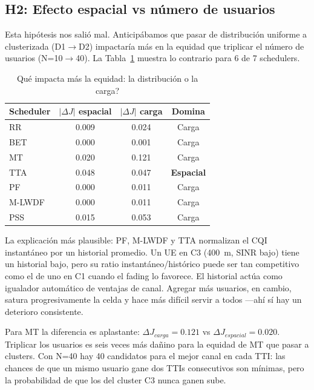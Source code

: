 \documentclass[conference]{IEEEtran}
\begin{document}
\subsection{H2: Efecto espacial vs número de usuarios}

Esta hipótesis nos salió mal. Anticipábamos que pasar de distribución uniforme a
clusterizada (D1$\to$D2) impactaría más en la equidad que triplicar el número de
usuarios (N=10$\to$40). La Tabla~\ref{tab:h2} muestra lo contrario para 6 de 7
schedulers.

\begin{table}[t]
  \centering
  \caption{\textquestiondown{}Qué impacta más la equidad: la distribución o la carga?}
  \label{tab:h2}
  \footnotesize
  \begin{tabular}{@{}lccc@{}}
    \toprule
    \textbf{Scheduler} & $|\Delta J|$ \textbf{espacial} & $|\Delta J|$ \textbf{carga} & \textbf{Domina} \\
    \midrule
    RR     & 0.009 & 0.024 & Carga \\
    BET    & 0.000 & 0.001 & Carga \\
    MT     & 0.020 & 0.121 & Carga \\
    TTA    & 0.048 & 0.047 & \textbf{Espacial} \\
    PF     & 0.000 & 0.011 & Carga \\
    M-LWDF & 0.000 & 0.011 & Carga \\
    PSS    & 0.015 & 0.053 & Carga \\
    \bottomrule
  \end{tabular}
\end{table}

La explicación más plausible: PF, M-LWDF y TTA normalizan el CQI instantáneo por un
historial promedio. Un UE en C3 (400~m, SINR bajo) tiene un historial bajo, pero su
ratio instantáneo/histórico puede ser tan competitivo como el de uno en C1 cuando el
fading lo favorece. El historial actúa como igualador automático de ventajas de canal.
Agregar más usuarios, en cambio, satura progresivamente la celda y hace más difícil
servir a todos ---ahí sí hay un deterioro consistente.

Para MT la diferencia es aplastante: $\Delta J_{carga}=0.121$ vs $\Delta J_{espacial}=0.020$.
Triplicar los usuarios es seis veces más dañino para la equidad de MT que pasar a
clusters. Con N=40 hay 40 candidatos para el mejor canal en cada TTI: las chances de
que un mismo usuario gane dos TTIs consecutivos son mínimas, pero la probabilidad de
que los del cluster C3 nunca ganen sube.
\end{document}
